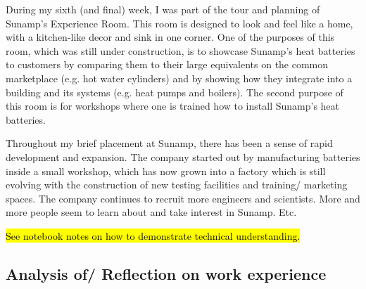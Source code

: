 During my sixth (and final) week, I was part of the tour and planning of Sunamp's Experience Room.
This room is designed to look and feel like a home, with a kitchen-like decor and sink in one corner.
One of the purposes of this room, which was still under construction, is to showcase Sunamp's heat batteries to customers by comparing them to their large equivalents on the common marketplace (e.g. hot water cylinders) and by showing how they integrate into a building and its systems (e.g. heat pumps
and boilers).
The second purpose of this room is for workshops where one is trained how to install Sunamp's heat batteries.

Throughout my brief placement at Sunamp, there has been a sense of rapid development and expansion.
The company started out by manufacturing batteries inside a small workshop, which has now grown into a factory which is still evolving with the construction of new testing facilities and training/ marketing spaces.
The company continues to recruit more engineers and scientists.
More and more people seem to learn about and take interest in Sunamp.
Etc.

\hl{See notebook notes on how to demonstrate technical understanding.}


\subsection{Analysis of/ Reflection on work experience}


